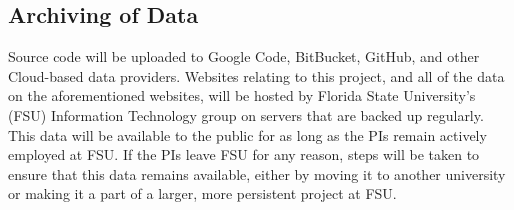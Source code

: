 \documentclass[11pt]{article}
\begin{document}
\subsection*{Archiving of Data} 
Source code will be uploaded to Google Code, BitBucket, GitHub, and
other Cloud-based data providers.  Websites relating to this project,
and all of the data on the aforementioned websites, will be hosted by
Florida State University's (FSU) Information Technology group on
servers that are backed up regularly.  This data will be available to
the public for as long as the PIs remain actively employed at FSU.  If
the PIs leave FSU for any reason, steps will be taken to ensure that
this data remains available, either by moving it to another university
or making it a part of a larger, more persistent project at FSU.
\end{document}

